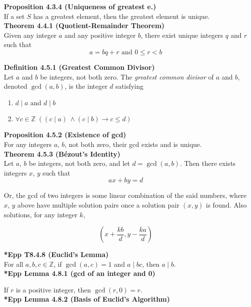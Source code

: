 \documentclass[a4paper]{article}
\newcommand{\subheading}[1]{{\scriptsize\textbf{#1}}}
\begin{document}
\begin{multicols*}{4}
\subheading{Proposition 4.3.4 (Uniqueness of greatest e.)}\\
If a set $S$ has a greatest element, then the greatest element is unique.\\

\subheading{Theorem 4.4.1 (Quotient-Remainder Theorem)}\\
Given any integer $a$ and any positive integer $b$, there exist unique integers
$q$ and $r$ such that $$ a = bq + r \text{ and } 0 \leq r < b$$

\subheading{Definition 4.5.1 (Greatest Common Divisor)}\\
Let $a$ and $b$ be integers, not both zero. The \textit{greatest common divisor}
of $a$ and $b$, denoted $\gcd(a, b)$, is the integer $d$ satisfying

\begin{enumerate} \itemsep -0.5em
  \item $d\;|\;a$ and $d\;|\;b$
  \item $\forall c \in \mathbb{Z}\;((c\;|\;a)\ \land (c\;|\;b) \rightarrow c \leq d)$
\end{enumerate}

\subheading{Proposition 4.5.2 (Existence of gcd)}\\
For any integers $a$, $b$, not both zero, their gcd exists and is unique.\\

\subheading{Theorem 4.5.3 (B\'ezout's Identity)}\\
Let $a$, $b$ be integers, not both zero, and let $d = \gcd(a, b)$. Then
there exists integers $x$, $y$ such that $$ax + by = d$$

Or, the gcd of two integers is some linear combination of the said numbers,
where $x$, $y$ above have multiple solution pairs once a solution pair $(x, y)$
is found. Also solutions, for any integer $k$,

$$ (x+\frac{kb}{d}, y-\frac{ka}{d}) $$

\subheading{*Epp T8.4.8 (Euclid's Lemma)}\\
For all $a, b, c \in \mathbb{Z}$, if $\gcd(a, c) = 1$ and $a\;|\;bc$,
then $a\;|\;b$.\\

\subheading{*Epp Lemma 4.8.1 (gcd of an integer and 0)}

If $r$ is a positive integer, then $\gcd(r, 0) = r$.\\

\subheading{*Epp Lemma 4.8.2 (Basis of Euclid's Algorithm)}


\end{multicols*}
\end{document}
